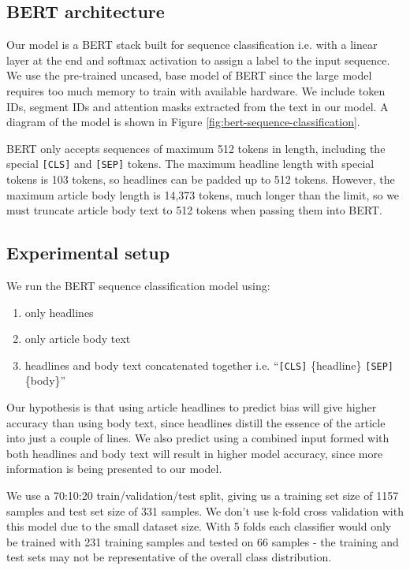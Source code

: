 \subsection{BERT architecture}

Our model is a BERT stack built for sequence classification i.e. with a linear layer at the end and softmax activation to assign a label to the input sequence. We use the pre-trained uncased, base model of BERT since the large model requires too much memory to train with available hardware. We include token IDs, segment IDs and attention masks extracted from the text in our model. A diagram of the model is shown in Figure \ref{fig:bert-sequence-classification}.

BERT only accepts sequences of maximum 512 tokens in length, including the special \texttt{[CLS]} and \texttt{[SEP]} tokens. The maximum headline length with special tokens is 103 tokens, so headlines can be padded up to 512 tokens. However, the maximum article body length is 14,373 tokens, much longer than the limit, so we must truncate article body text to 512 tokens when passing them into BERT.

\subsection{Experimental setup}

We run the BERT sequence classification model using:

\begin{enumerate}
    \item only headlines
    \item only article body text
    \item headlines and body text concatenated together i.e. ``\texttt{[CLS]} \{headline\} \texttt{[SEP]} \{body\}''
\end{enumerate}

Our hypothesis is that using article headlines to predict bias will give higher accuracy than using body text, since headlines distill the essence of the article into just a couple of lines. We also predict using a combined input formed with both headlines and body text will result in higher model accuracy, since more information is being presented to our model.

We use a 70:10:20 train/validation/test split, giving us a training set size of 1157 samples and test set size of 331 samples. We don't use k-fold cross validation with this model due to the small dataset size. With 5 folds each classifier would only be trained with 231 training samples and tested on 66 samples - the training and test sets may not be representative of the overall class distribution.

